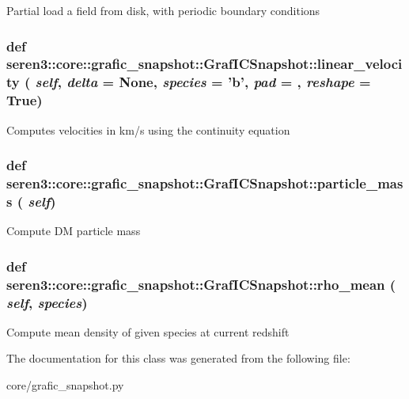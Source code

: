 \label{classseren3_1_1core_1_1grafic__snapshot_1_1GrafICSnapshot_a4cc2a0f15619694e65c70c5cd56c3dd8}
\begin{DoxyVerb}
Partial load a field from disk, with periodic boundary conditions
\end{DoxyVerb}
 \hypertarget{classseren3_1_1core_1_1grafic__snapshot_1_1GrafICSnapshot_aad4bf2ecaf6f4f9dd009090af1d8935f}{
\subsubsection[{linear\_\-velocity}]{\setlength{\rightskip}{0pt plus 5cm}def seren3::core::grafic\_\-snapshot::GrafICSnapshot::linear\_\-velocity ( {\em self}, \/   {\em delta} = {\ttfamily None}, \/   {\em species} = {\ttfamily 'b'}, \/   {\em pad} = {}, \/   {\em reshape} = {\ttfamily True})}}
\label{classseren3_1_1core_1_1grafic__snapshot_1_1GrafICSnapshot_aad4bf2ecaf6f4f9dd009090af1d8935f}
\begin{DoxyVerb}
Computes velocities in km/s using the continuity equation
\end{DoxyVerb}
 \hypertarget{classseren3_1_1core_1_1grafic__snapshot_1_1GrafICSnapshot_af4a26de0162d63e72e4b95b37dde0653}{
\subsubsection[{particle\_\-mass}]{\setlength{\rightskip}{0pt plus 5cm}def seren3::core::grafic\_\-snapshot::GrafICSnapshot::particle\_\-mass ( {\em self})}}
\label{classseren3_1_1core_1_1grafic__snapshot_1_1GrafICSnapshot_af4a26de0162d63e72e4b95b37dde0653}
\begin{DoxyVerb}
Compute DM particle mass
\end{DoxyVerb}
 \hypertarget{classseren3_1_1core_1_1grafic__snapshot_1_1GrafICSnapshot_a5ef8f9c0a37a0afb78eadad29e1ded2a}{
\subsubsection[{rho\_\-mean}]{\setlength{\rightskip}{0pt plus 5cm}def seren3::core::grafic\_\-snapshot::GrafICSnapshot::rho\_\-mean ( {\em self}, \/   {\em species})}}
\label{classseren3_1_1core_1_1grafic__snapshot_1_1GrafICSnapshot_a5ef8f9c0a37a0afb78eadad29e1ded2a}
\begin{DoxyVerb}
Compute mean density of given species at current redshift
\end{DoxyVerb}
 

The documentation for this class was generated from the following file:\begin{DoxyCompactItemize}
\item 
core/grafic\_\-snapshot.py\end{DoxyCompactItemize}

